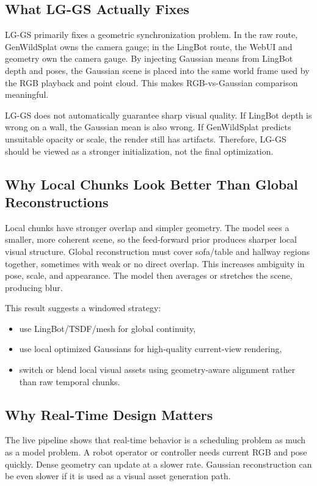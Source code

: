 \documentclass[11pt]{article}
\newcommand{\methodabbr}{LG-GS}
\newcommand{\RouteB}{\methodabbr\xspace}
\begin{document}
\subsection{What \RouteB Actually Fixes}

\RouteB primarily fixes a geometric synchronization problem. In the raw route, GenWildSplat owns the camera gauge; in the LingBot route, the WebUI and geometry own the camera gauge. By injecting Gaussian means from LingBot depth and poses, the Gaussian scene is placed into the same world frame used by the RGB playback and point cloud. This makes RGB-vs-Gaussian comparison meaningful.

\RouteB does not automatically guarantee sharp visual quality. If LingBot depth is wrong on a wall, the Gaussian mean is also wrong. If GenWildSplat predicts unsuitable opacity or scale, the render still has artifacts. Therefore, \RouteB should be viewed as a stronger initialization, not the final optimization.

\subsection{Why Local Chunks Look Better Than Global Reconstructions}

Local chunks have stronger overlap and simpler geometry. The model sees a smaller, more coherent scene, so the feed-forward prior produces sharper local visual structure. Global reconstruction must cover sofa/table and hallway regions together, sometimes with weak or no direct overlap. This increases ambiguity in pose, scale, and appearance. The model then averages or stretches the scene, producing blur.

This result suggests a windowed strategy:

\begin{itemize}
    \item use LingBot/TSDF/mesh for global continuity,
    \item use local optimized Gaussians for high-quality current-view rendering,
    \item switch or blend local visual assets using geometry-aware alignment rather than raw temporal chunks.
\end{itemize}

\subsection{Why Real-Time Design Matters}

The live pipeline shows that real-time behavior is a scheduling problem as much as a model problem. A robot operator or controller needs current RGB and pose quickly. Dense geometry can update at a slower rate. Gaussian reconstruction can be even slower if it is used as a visual asset generation path.
\end{document}
